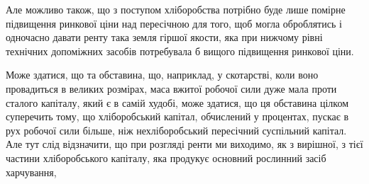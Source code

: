 Але можливо також, що з поступом хліборобства потрібно буде лише помірне
підвищення ринкової ціни над пересічною для того, щоб могла оброблятись
і одночасно давати ренту така земля гіршої якости, яка при нижчому рівні
технічних допоміжних засобів потребувала б вищого підвищення ринкової ціни.

Може здатися, що та обставина, що, наприклад, у скотарстві, коли воно провадиться
в великих розмірах, маса вжитої робочої сили дуже мала проти сталого
капіталу, який є в самій худобі, може здатися, що ця обставина цілком суперечить
тому, що хліборобський капітал, обчислений у процентах, пускає в рух робочої
сили більше, ніж нехліборобський пересічний суспільний капітал. Але тут слід
відзначити, що при розгляді ренти ми виходимо, як з вирішної, з тієї частини
хліборобського капіталу, яка продукує основний рослинний засіб харчування,
